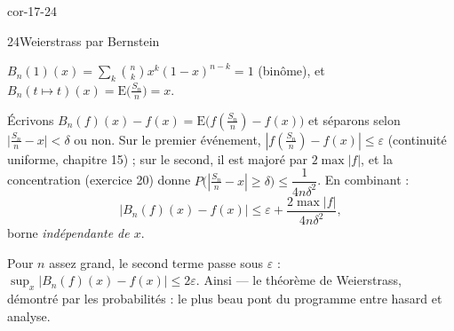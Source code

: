 \begin{blocLivre}{cor-17-24}
\begin{corrige}{24}{Weierstrass par Bernstein}
\begin{questions}
  \item $B_n(1)(x)=\sum_k\binom nk x^{k}(1-x)^{n-k}=1$ (binôme), et
    $B_n(t\mapsto t)(x)=\mathrm{E}\bigl(\tfrac{S_n}{n}\bigr)=x$.
  \item Écrivons
    $B_n(f)(x)-f(x)
    =\mathrm{E}\bigl(f(\tfrac{S_n}{n})-f(x)\bigr)$ et séparons selon
    $\bigl|\tfrac{S_n}{n}-x\bigr|<\delta$ ou non. Sur le premier
    événement, $|f(\tfrac{S_n}{n})-f(x)|\leqslant\varepsilon$ (continuité
    uniforme, chapitre 15) ; sur le second, il est majoré par
    $2\max|f|$, et la concentration (exercice 20) donne
    $P\bigl(|\tfrac{S_n}{n}-x|\geqslant\delta\bigr)
    \leqslant\dfrac{1}{4n\delta^{2}}$. En combinant :
    \[
    \bigl|B_n(f)(x)-f(x)\bigr|
    \leqslant\varepsilon+\frac{2\max|f|}{4n\delta^{2}} ,
    \]
    borne \emph{indépendante de $x$}.
  \item Pour $n$ assez grand, le second terme passe sous $\varepsilon$ :
    $\sup_{x}|B_n(f)(x)-f(x)|\leqslant2\varepsilon$. Ainsi
     — le théorème de Weierstrass, démontré par les
    probabilités : le plus beau pont du programme entre hasard et
    analyse.
\end{questions}
\end{corrige}
\end{blocLivre}


